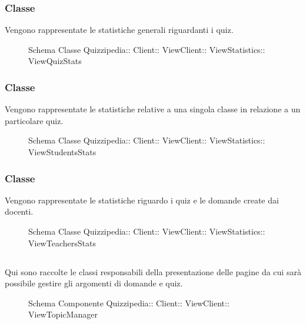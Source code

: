 \subsubsection{Classe }
Vengono rappresentate le statistiche generali riguardanti i quiz.
\begin{figure}[H]
\centering
\noindent{}
\caption[Schema Classe ViewQuizStats]{Schema Classe Quizzipedia:: Client:: ViewClient:: ViewStatistics:: ViewQuizStats}
\end{figure}
\subsubsection{Classe }
Vengono rappresentate le statistiche relative a una singola classe in relazione a un particolare quiz.
\begin{figure}[H]
\centering
\noindent{}
\caption[Schema Classe ViewStudentsStats]{Schema Classe Quizzipedia:: Client:: ViewClient:: ViewStatistics:: ViewStudentsStats}
\end{figure}
\subsubsection{Classe }
Vengono rappresentate le statistiche riguardo i quiz e le domande create dai docenti.
\begin{figure}[H]
\centering
\noindent{}
\caption[Schema Classe ViewTeachersStats]{Schema Classe Quizzipedia:: Client:: ViewClient:: ViewStatistics:: ViewTeachersStats}
\end{figure}
\subsection{}
Qui sono raccolte le classi responsabili della presentazione delle pagine da cui sarà possibile gestire gli argomenti di domande e quiz.
\begin{figure}[H]
\centering
\noindent{}
\caption[Schema Componente Quizzipedia::Client::ViewClient::ViewTopicManager]{Schema Componente Quizzipedia:: Client:: ViewClient:: ViewTopicManager}
\end{figure}
